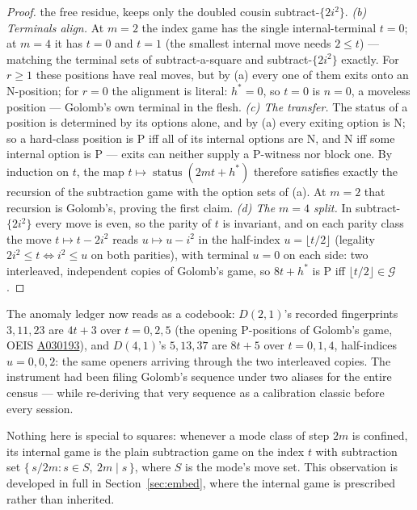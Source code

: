 \begin{proof}
the free residue, keeps only the doubled cousin subtract-$\{2i^2\}$.
\emph{(b) Terminals align.} At $m = 2$ the index game has the single
internal-terminal $t = 0$; at $m = 4$ it has $t = 0$ and $t = 1$ (the
smallest internal move needs $2 \le t$) --- matching the terminal sets of
subtract-a-square and subtract-$\{2i^2\}$ exactly. For $r \ge 1$ these
positions have real moves, but by (a) every one of them exits onto an
N-position; for $r = 0$ the alignment is literal: $h^* = 0$, so $t = 0$ is
$n = 0$, a moveless position --- Golomb's own terminal in the flesh.
\emph{(c) The transfer.} The status of a position is determined by its
options alone, and by (a) every exiting option is N; so a hard-class
position is P iff all of its internal options are N, and N iff some
internal option is P --- exits can neither supply a P-witness nor block
one. By induction on $t$, the map $t \mapsto \operatorname{status}(2mt+h^*)$
therefore satisfies exactly the recursion of the subtraction game with
the option sets of (a). At $m = 2$ that recursion is Golomb's, proving
the first claim.
\emph{(d) The $m = 4$ split.} In subtract-$\{2i^2\}$ every move is even,
so the parity of $t$ is invariant, and on each parity class the move
$t \mapsto t - 2i^2$ reads $u \mapsto u - i^2$ in the half-index
$u = \lfloor t/2 \rfloor$ (legality $2i^2 \le t \iff i^2 \le u$ on both
parities), with terminal $u = 0$ on each side: two interleaved,
independent copies of Golomb's game, so $8t + h^*$ is P iff
$\lfloor t/2 \rfloor \in \mathcal{G}$.
\end{proof}

The anomaly ledger now reads as a codebook: $D(2,1)$'s recorded
fingerprints $3, 11, 23$ are $4t + 3$ over $t = 0, 2, 5$ (the opening
P-positions of Golomb's game, OEIS
\href{https://oeis.org/A030193}{A030193}), and $D(4,1)$'s
$5, 13, 37$ are $8t + 5$ over $t = 0, 1, 4$, half-indices
$u = 0, 0, 2$: the same openers arriving through the two interleaved
copies. The instrument had been filing Golomb's sequence under two
aliases for the entire census --- while re-deriving that very sequence
as a calibration classic before every session.

\begin{remark}\label{rem:confined-game}
Nothing here is special to squares: whenever a mode class of step $2m$
is confined, its internal game is the plain subtraction game on the
index $t$ with subtraction set $\{\, s/2m : s \in S,\ 2m \mid s \,\}$,
where $S$ is the mode's move set. This observation is developed in full
in Section~\ref{sec:embed}, where the internal game is prescribed rather
than inherited.
\end{remark}

